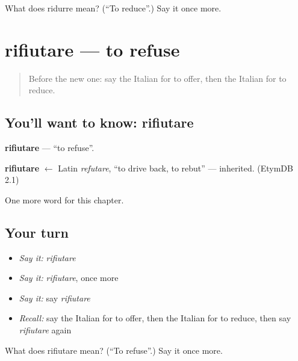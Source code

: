 \begin{tcolorbox}[breakable,colback=teal!4,colframe=teal!35!black,title={Before you move on}]
What does ridurre mean? (\textquotedblleft{}To reduce\textquotedblright{}.) Say it once more.
\end{tcolorbox}
\section[rifiutare]{rifiutare — to refuse}

\label{lesson:IT-C147-rifiutare}



\begin{quote}
Before the new one: say the Italian for to offer, then the Italian for to reduce.
\end{quote}

\subsection*{You'll want to know: rifiutare}
\textbf{rifiutare} — \textquotedblleft{}to refuse\textquotedblright{}.

\begin{cousinweb}
\textbf{rifiutare} $\leftarrow$ Latin \emph{refutare}, \textquotedblleft{}to drive back, to rebut\textquotedblright{} — inherited. (EtymDB 2.1)
\end{cousinweb}

\begin{grammarlens}[title={What you've built}]
One more word for this chapter.
\end{grammarlens}

\subsection*{Your turn}
\begin{itemize}
\raggedright
  \item \emph{Say it:} \emph{rifiutare}
  \item \emph{Say it:} \emph{rifiutare}, once more
  \item \emph{Say it:} say \emph{rifiutare}
  \item \emph{Recall:} say the Italian for to offer, then the Italian for to reduce, then say \emph{rifiutare} again
\end{itemize}

\begin{tcolorbox}[breakable,colback=teal!4,colframe=teal!35!black,title={Before you move on}]
What does rifiutare mean? (\textquotedblleft{}To refuse\textquotedblright{}.) Say it once more.
\end{tcolorbox}
